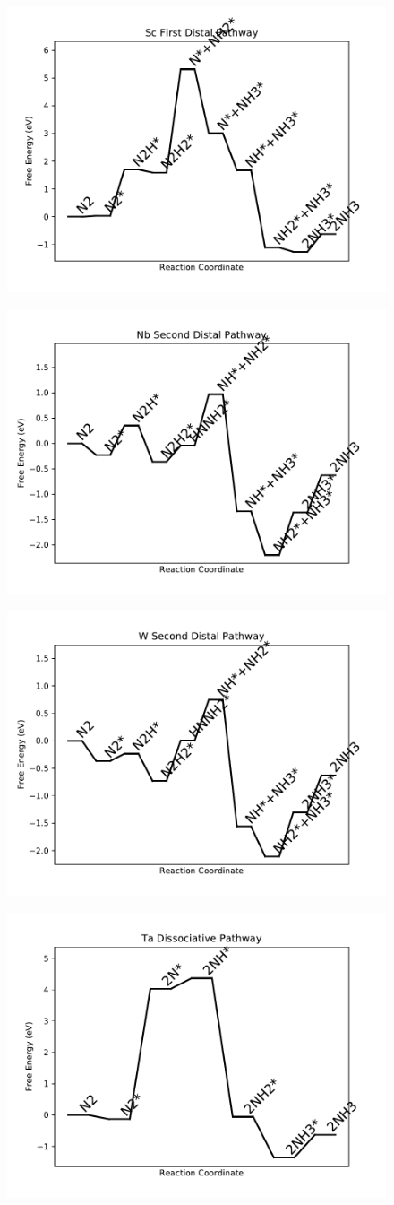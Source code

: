 \begin{figure}
\includegraphics[width=0.5\linewidth]{data/plots/Sc_distal_1.pdf}
\label{fig:Sc_distal_1}
\end{figure}

\begin{figure}
\includegraphics[width=0.5\linewidth]{data/plots/Nb_distal_2.pdf}
\label{fig:Nb_distal_2}
\end{figure}

\begin{figure}
\includegraphics[width=0.5\linewidth]{data/plots/W_distal_2.pdf}
\label{fig:W_distal_2}
\end{figure}

\begin{figure}
\includegraphics[width=0.5\linewidth]{data/plots/Ta_dissociative.pdf}
\label{fig:Ta_dissociative}
\end{figure}

